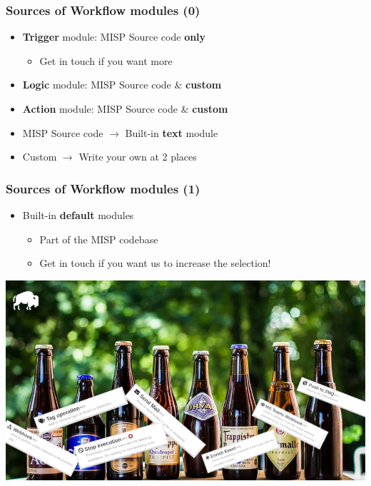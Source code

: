\begin{frame}
    \frametitle{Sources of Workflow modules (0)}
    \begin{itemize}
        \item \textbf{Trigger} module: MISP Source code \textbf{only}
        \begin{itemize}
            \item Get in touch if you want more
        \end{itemize}
        \item \textbf{Logic} module: MISP Source code \& \textbf{custom}
        \item \textbf{Action} module: MISP Source code \& \textbf{custom}
    \end{itemize}
    \vspace*{2.0em}
    \begin{itemize}
        \item MISP Source code $\rightarrow$ Built-in \textbf{text} module
        \item Custom $\rightarrow$ Write your own at 2 places
    \end{itemize}
\end{frame}

\begin{frame}
    \frametitle{Sources of Workflow modules (1)}
    \begin{itemize}
        \item Built-in \textbf{default} modules
        \begin{itemize}
            \item Part of the MISP codebase
            \item Get in touch if you want us to increase the selection!
        \end{itemize}
    \end{itemize}
    \vspace*{0.5em}
    \begin{center}
        \includegraphics[width=0.8\linewidth]{pictures/module-buffet.png}
    \end{center}
\end{frame}

